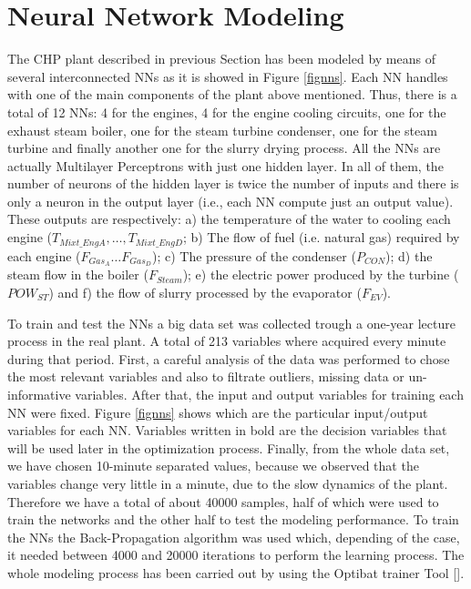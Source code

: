 \section{Neural Network Modeling}
\label{NN}


The CHP plant described in previous Section has been modeled by means of several interconnected NNs as it is showed in Figure \ref{fignns}. Each NN handles with one of the main components of the plant above mentioned. Thus, there is a total of 12 NNs: 4 for the engines, 4 for the engine cooling  circuits, one for the exhaust steam boiler, one for the steam turbine condenser, one for the steam turbine and finally another one for the slurry drying process. All the NNs are actually Multilayer Perceptrons with just one hidden layer. In all of them, the number of neurons of the hidden layer is twice the number of inputs and there is only a neuron in the output layer (i.e., each NN compute just an output value). These outputs are respectively: a) the temperature of the water to cooling each engine ($T_{Mixt\_EngA}, \dots, T_{Mixt\_EngD}$; b) The flow of fuel (i.e. natural gas) required by each engine ($F_{Gas_A} \dots F_{Gas_D}$); c) The pressure of the condenser ($P_{CON}$); d) the steam flow in the boiler ($F_{Steam}$); e) the electric power produced by the turbine ($POW_{ST}$) and f) the flow of slurry processed by the evaporator ($F_{EV}$). 

To train and test the NNs a big data set was collected trough a one-year lecture process in the real plant. A total of  213 variables where acquired every minute during that period. First, a careful analysis of the data was performed to chose the most relevant variables and also to filtrate outliers, missing data or un-informative variables. %
After that, the input and output variables for training each NN were fixed. Figure \ref{fignns} shows which are the particular input/output variables for each NN. Variables written in bold are the decision variables that will be used later in the optimization process. Finally, from the whole data set, we have chosen 10-minute separated values, because we observed that the variables change very little in a minute, due to the slow dynamics of the plant. Therefore we have a total of about 40000 samples, half of which were used to train the networks and the other half to test the modeling performance. To train the NNs the Back-Propagation algorithm was used which, depending of the case, it needed between 4000 and 20000 iterations to perform the learning process. %
The whole modeling process has been carried out by using the Optibat trainer Tool [].

